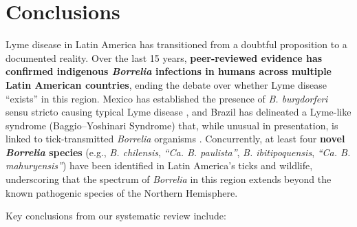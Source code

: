 \documentclass[11pt,letterpaper]{article}
\begin{document}
\section{Conclusions}
Lyme disease in Latin America has transitioned from a doubtful proposition to a documented reality. Over the last 15 years, \textbf{peer-reviewed evidence has confirmed indigenous \textit{Borrelia} infections in humans across multiple Latin American countries}, ending the debate over whether Lyme disease “exists” in this region. Mexico has established the presence of \textit{B. burgdorferi} sensu stricto causing typical Lyme disease \citep{Colunga-Salas2020q}, and Brazil has delineated a Lyme-like syndrome (Baggio–Yoshinari Syndrome) that, while unusual in presentation, is linked to tick-transmitted \textit{Borrelia} organisms \citep{Yoshinari2022an, Yoshinari2022ao}. Concurrently, at least four \textbf{novel \textit{Borrelia} species} (e.g., \textit{B. chilensis}, \textit{“Ca. B. paulista”}, \textit{B. ibitipoquensis}, \textit{“Ca. B. mahuryensis”}) have been identified in Latin America’s ticks and wildlife, underscoring that the spectrum of \textit{Borrelia} in this region extends beyond the known pathogenic species of the Northern Hemisphere.

Key conclusions from our systematic review include:
\end{document}
